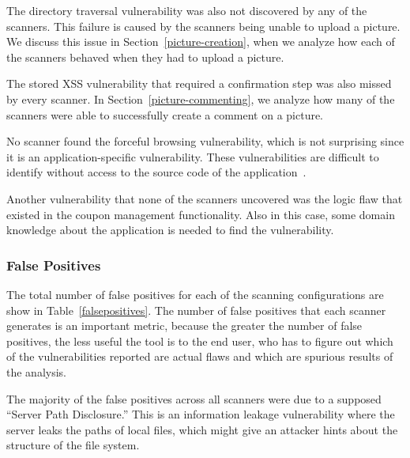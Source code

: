The directory traversal vulnerability was also not discovered by any of the
scanners. This failure is caused by the scanners being unable to
upload a picture. We
discuss this issue in Section~\ref{picture-creation}, when we analyze how each of the
scanners behaved when they had to upload a picture.

The stored XSS vulnerability that required a confirmation step was also missed
by every scanner. In Section~\ref{picture-commenting}, we analyze how many of
the scanners were able to successfully create a comment on a picture.

No scanner found the forceful browsing vulnerability, which is not 
surprising since it is an application-specific
vulnerability. These vulnerabilities are difficult to identify
without access to the source code of the application~\cite{balzarotti07mimosa}.

Another vulnerability that none of the scanners uncovered was the
logic flaw that existed in the coupon management functionality. 
Also in this case, some domain knowledge about the application is needed to
find the vulnerability.





\subsubsection{False Positives}

The total number of false positives for each of the scanning
configurations are show in Table~\ref{falsepositives}.
The number 
of false positives that each scanner generates is an important metric, because
the greater the number of false positives, the less useful the tool is to the
end user, who has to figure out which of the vulnerabilities reported are actual
flaws and which are spurious results of the analysis. 

The majority of the false positives across all scanners were due to a supposed
``Server Path Disclosure.'' This is an information leakage vulnerability where
the server leaks the paths of local files, which might give an attacker 
hints about the structure of the file system.

